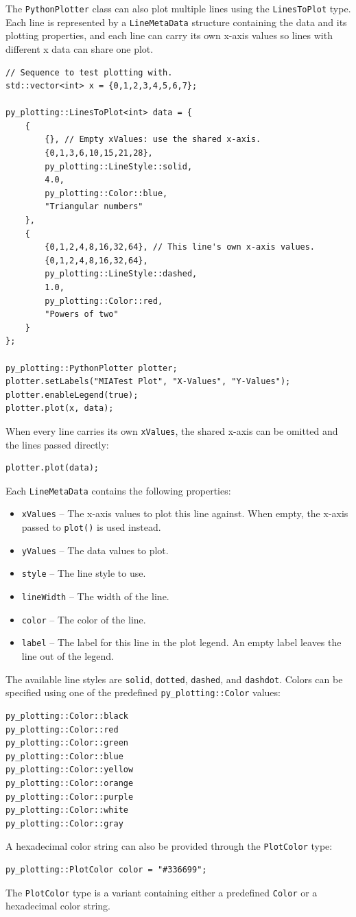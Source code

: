 The \texttt{PythonPlotter} class can also plot multiple lines using the \texttt{LinesToPlot} type. Each line is represented by a \texttt{LineMetaData} structure containing the data and its plotting properties, and each line can carry its own x-axis values so lines with different x data can share one plot.
\begin{lstlisting}[style=cppstyle]
// Sequence to test plotting with.
std::vector<int> x = {0,1,2,3,4,5,6,7};

py_plotting::LinesToPlot<int> data = {
	{
		{}, // Empty xValues: use the shared x-axis.
		{0,1,3,6,10,15,21,28},
		py_plotting::LineStyle::solid,
		4.0,
		py_plotting::Color::blue,
		"Triangular numbers"
	},
	{
		{0,1,2,4,8,16,32,64}, // This line's own x-axis values.
		{0,1,2,4,8,16,32,64},
		py_plotting::LineStyle::dashed,
		1.0,
		py_plotting::Color::red,
		"Powers of two"
	}
};

py_plotting::PythonPlotter plotter;
plotter.setLabels("MIATest Plot", "X-Values", "Y-Values");
plotter.enableLegend(true);
plotter.plot(x, data);
\end{lstlisting}
When every line carries its own \texttt{xValues}, the shared x-axis can be omitted and the lines passed directly:
\begin{lstlisting}[style=cppstyle]
plotter.plot(data);
\end{lstlisting}
Each \texttt{LineMetaData} contains the following properties:
\begin{itemize}\itemsep0em
	\item \texttt{xValues} -- The x-axis values to plot this line against. When empty, the x-axis passed to \texttt{plot()} is used instead.
	\item \texttt{yValues} -- The data values to plot.
	\item \texttt{style} -- The line style to use.
	\item \texttt{lineWidth} -- The width of the line.
	\item \texttt{color} -- The color of the line.
	\item \texttt{label} -- The label for this line in the plot legend. An empty label leaves the line out of the legend.
\end{itemize}
The available line styles are \texttt{solid}, \texttt{dotted}, \texttt{dashed}, and \texttt{dashdot}. Colors can be specified using one of the predefined \texttt{py\_plotting::Color} values:
\begin{lstlisting}[style=cppstyle]
py_plotting::Color::black
py_plotting::Color::red
py_plotting::Color::green
py_plotting::Color::blue
py_plotting::Color::yellow
py_plotting::Color::orange
py_plotting::Color::purple
py_plotting::Color::white
py_plotting::Color::gray
\end{lstlisting}
A hexadecimal color string can also be provided through the \texttt{PlotColor} type:
\begin{lstlisting}[style=cppstyle]
py_plotting::PlotColor color = "#336699";
\end{lstlisting}
The \texttt{PlotColor} type is a variant containing either a predefined \texttt{Color} or a hexadecimal color string.

